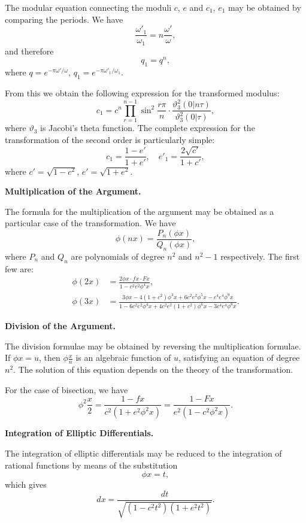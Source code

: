 \documentclass[12pt,a4paper]{article}
\begin{document}
The modular equation connecting the moduli $c$, $e$ and $c_1$, $e_1$ may be obtained by
comparing the periods. We have
\[
\frac{\omega'_1}{\omega_1} = n \frac{\omega'}{\omega},
\]
and therefore
\[
q_1 = q^n,
\]
where $q = e^{-\pi \omega'/\omega}$, $q_1 = e^{-\pi \omega'_1/\omega_1}$.

\newpage
\setcounter{page}{147}

From this we obtain the following expression for the transformed modulus:
\[
c_1 = c^n \prod_{r=1}^{n-1} \sin^2 \frac{r\pi}{n} \cdot \frac{\vartheta_3^2(0 | n\tau)}{\vartheta_3^2(0 | \tau)},
\]
where $\vartheta_3$ is Jacobi's theta function. The complete expression for the transformation of
the second order is particularly simple:
\[
c_1 = \frac{1 - e'}{1 + e'},\quad e'_1 = \frac{2\sqrt{c'}}{1 + c'},
\]
where $c' = \sqrt{1 - c^2}$, $e' = \sqrt{1 + e^2}$.

\medskip

\textbf{Multiplication of the Argument.}

The formula for the multiplication of the argument may be obtained as a particular
case of the transformation. We have
\[
\phi(nx) = \frac{P_n(\phi x)}{Q_n(\phi x)},
\]
where $P_n$ and $Q_n$ are polynomials of degree $n^2$ and $n^2 - 1$ respectively. The first few
are:
\begin{align*}
\phi(2x) &= \frac{2\phi x \cdot f x \cdot F x}{1 - c^2 e^2 \phi^4 x},\\
\phi(3x) &= \frac{3\phi x - 4(1 + c^2)\phi^3 x + 6c^2 e^2 \phi^5 x - c^4 e^4 \phi^9 x}{1 - 6c^2 e^2 \phi^4 x + 4c^2 e^2(1 + c^2)\phi^6 x - 3c^4 e^4 \phi^8 x}.
\end{align*}

\newpage
\setcounter{page}{148}

\textbf{Division of the Argument.}

The division formulae may be obtained by reversing the multiplication formulae.
If $\phi x = u$, then $\phi\frac{x}{n}$ is an algebraic function of $u$, satisfying an equation of
degree $n^2$. The solution of this equation depends on the theory of the transformation.

For the case of bisection, we have
\[
\phi^2\frac{x}{2} = \frac{1 - f x}{c^2(1 + e^2 \phi^2 x)} = \frac{1 - F x}{e^2(1 - c^2 \phi^2 x)}.
\]

\medskip

\textbf{Integration of Elliptic Differentials.}

The integration of elliptic differentials may be reduced to the integration of
rational functions by means of the substitution
\[
\phi x = t,
\]
which gives
\[
dx = \frac{dt}{\sqrt{(1 - c^2 t^2)(1 + e^2 t^2)}}.
\]
\end{document}
